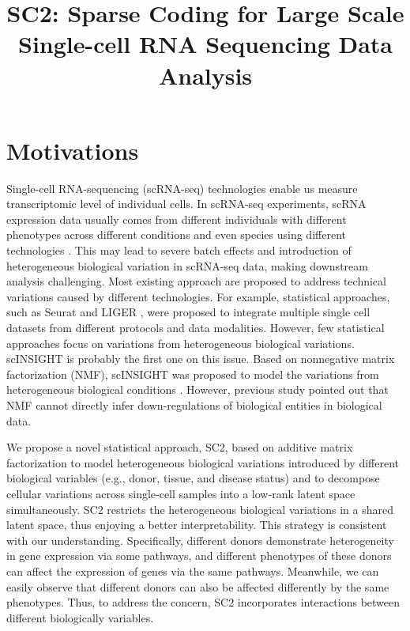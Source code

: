 \documentclass[12pt]{article}
\begin{document}
\title{SC2: Sparse Coding for Large Scale Single-cell RNA Sequencing Data Analysis}
\date{}
\maketitle

\section{Motivations}
  Single-cell RNA-sequencing (scRNA-seq) technologies enable us measure transcriptomic level of individual cells. In scRNA-seq experiments, scRNA expression data usually comes from different individuals with different phenotypes across different conditions and even species using different technologies \cite{butler2018integrating}. This may lead to severe batch effects and introduction of heterogeneous biological variation in scRNA-seq data, making downstream analysis challenging. Most existing approach are proposed to address technical variations caused by different technologies. For example, statistical approaches, such as Seurat \cite{butler2018integrating} and LIGER \cite{liu2020jointly}, were proposed to integrate multiple single cell datasets from different protocols and data modalities. However, few statistical approaches focus on variations from heterogeneous biological variations. scINSIGHT \cite{qian2022scinsight} is probably the first one on this issue. Based on nonnegative matrix factorization (NMF), scINSIGHT was proposed to model the variations from heterogeneous biological conditions \cite{qian2022scinsight}. However, previous study \cite{stein2018enter} pointed out that NMF cannot directly infer down-regulations of biological entities in biological data.

  We propose a novel statistical approach, SC2, based on additive matrix factorization to model heterogeneous biological variations introduced by different biological variables (e.g., donor, tissue, and disease status) and to decompose cellular variations across single-cell samples into a low-rank latent space simultaneously. SC2 restricts the heterogeneous biological variations in a shared latent space, thus enjoying a better interpretability. This strategy is consistent with our understanding. Specifically, different donors demonstrate heterogeneity in gene expression via some pathways, and different phenotypes of these donors can affect the expression of genes via the same pathways. Meanwhile, we can easily observe that different donors can also be affected differently by the same phenotypes. Thus, to address the concern, SC2 incorporates interactions between different biologically variables.
\end{document}

